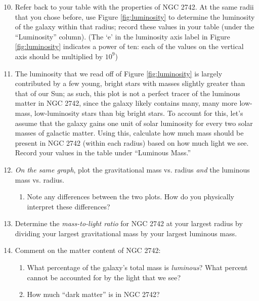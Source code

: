 \documentclass[11pt]{article}%
\begin{document}
\begin{enumerate}
\setcounter{enumi}{9}

\item Refer back to your table with the properties of NGC 2742. At the same radii that you chose before, use Figure \ref{fig:luminosity} to determine the luminosity of the galaxy within that radius; record these values in your table (under the ``Luminosity'' column). (The `e' in the luminosity axis label in Figure \ref{fig:luminosity} indicates a power of ten: each of the values on the vertical axis should be multiplied by $10^9$)

\item The luminosity that we read off of Figure \ref{fig:luminosity} is largely contributed by a few young, bright stars with masses slightly greater than that of our Sun; as such, this plot is not a perfect tracer of the luminous matter in NGC 2742, since the galaxy likely contains many, many more low-mass, low-luminosity stars than big bright stars. To account for this, let's assume that the galaxy gains one unit of solar luminosity for every two solar masses of galactic matter. Using this, calculate how much mass should be present in NGC 2742 (within each radius) based on how much light we see. Record your values in the table under ``Luminous Mass.'' 

\item \emph{On the same graph}, plot the gravitational mass vs. radius \emph{and} the luminous mass vs. radius.
    \begin{enumerate}
        \item Note any differences between the two plots. How do you physically interpret these differences?
    \end{enumerate}

\item Determine the \textit{mass-to-light ratio} for NGC 2742 at your largest radius by dividing your largest gravitational mass by your largest luminous mass. 

\item Comment on the matter content of NGC 2742:
\begin{enumerate}
    \item What percentage of the galaxy's total mass is \emph{luminous}? What percent cannot be accounted for by the light that we see?
    
    \item How much ``dark matter'' is in NGC 2742?
\end{enumerate}
 
\end{enumerate}
\end{document}
